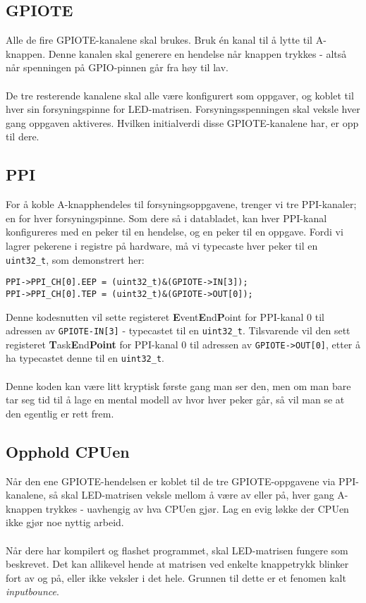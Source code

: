 \documentclass[11pt,a4paper]{article}
\begin{document}
\subsection{GPIOTE}
Alle de fire GPIOTE-kanalene skal brukes. Bruk én kanal til å lytte til A-knappen. Denne kanalen skal generere en hendelse når knappen trykkes - altså når spenningen på GPIO-pinnen går fra høy til lav.\\
\\
De tre resterende kanalene skal alle være konfigurert som oppgaver, og koblet til hver sin forsyningspinne for LED-matrisen. Forsyningsspenningen skal veksle hver gang oppgaven aktiveres. Hvilken initialverdi disse GPIOTE-kanalene har, er opp til dere.

\subsection{PPI}
For å koble A-knapphendeles til forsyningsoppgavene, trenger vi tre PPI-kanaler; en for hver forsyningspinne. Som dere så i databladet, kan hver PPI-kanal konfigureres med en peker til en hendelse, og en peker til en oppgave. Fordi vi lagrer pekerene i registre på hardware, må vi typecaste hver peker til en \texttt{uint32_t}, som demonstrert her:
\begin{verbatim}
PPI->PPI_CH[0].EEP = (uint32_t)&(GPIOTE->IN[3]);
PPI->PPI_CH[0].TEP = (uint32_t)&(GPIOTE->OUT[0]);
\end{verbatim}
Denne kodesnutten vil sette registeret \textbf{E}vent\textbf{E}nd\textbf{P}oint for PPI-kanal 0 til adressen av \texttt{GPIOTE-IN[3]} - typecastet til en \texttt{uint32_t}. Tilsvarende vil den sett registeret \textbf{T}ask\textbf{E}nd\textbf{Point} for PPI-kanal 0 til adressen av \texttt{GPIOTE->OUT[0]}, etter å ha typecastet denne til en \texttt{uint32_t}.\\
\\
Denne koden kan være litt kryptisk første gang man ser den, men om man bare tar seg tid til å lage en mental modell av hvor hver peker går, så vil man se at den egentlig er rett frem.

\subsection{Opphold CPUen}
Når den ene GPIOTE-hendelsen er koblet til de tre GPIOTE-oppgavene via PPI-kanalene, så skal LED-matrisen veksle mellom å være av eller på, hver gang A-knappen trykkes - uavhengig av hva CPUen gjør. Lag en evig løkke der CPUen ikke gjør noe nyttig arbeid.\\
\\
Når dere har kompilert og flashet programmet, skal LED-matrisen fungere som beskrevet. Det kan allikevel hende at matrisen ved enkelte knappetrykk blinker fort av og på, eller ikke veksler i det hele. Grunnen til dette er et fenomen kalt \textit{inputbounce}.
\end{document}
